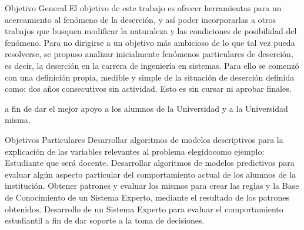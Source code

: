 Objetivo General
El objetivo de este trabajo es ofrecer herramientas para un acercamiento al fenómeno
de la deserción, y así poder incorporarlas a otros trabajos que busquen modificar la
naturaleza y las condiciones de posibilidad del fenómeno. Para no dirigirse a un
objetivo más ambicioso de lo que tal vez pueda resolverse, se propuso analizar
inicialmente fenómenos particulares de deserción, es decir, la deserción en la carrera
de ingeniería en sistemas. Para ello se comenzó con una definición propia, medible y
simple de la situación de deserción definida como: dos años consecutivos sin
actividad. Esto es sin cursar ni aprobar finales.


a fin de dar el mejor apoyo a los alumnos de la Universidad y a la Universidad misma.

Objetivos Particulares
Desarrollar algoritmos de modelos descriptivos para la explicación de las variables relevantes al problema elegidocomo ejemplo: Estudiante que será docente.
Desarrollar algoritmos de modelos predictivos para evaluar algún aspecto particular del comportamiento actual de los
alumnos de la institución.
Obtener patrones y evaluar los mismos para crear las reglas y la Base de Conocimiento de un Sistema Experto,
mediante el resultado de los patrones obtenidos.
Desarrollo de un Sistema Experto para evaluar el comportamiento estudiantil a fin de dar soporte a la toma de
decisiones.


